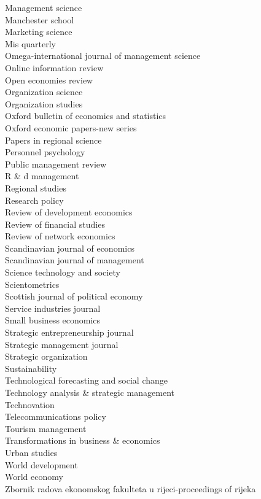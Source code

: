 \documentclass[a4paper]{article}
\begin{document}
\begin{footnotesize}
Management science \\ Manchester school \\ Marketing science \\ Mis quarterly \\ Omega-international journal of management science \\ Online information review \\ Open economies review \\ Organization science \\ Organization studies \\ Oxford bulletin of economics and statistics \\ Oxford economic papers-new series \\ Papers in regional science \\ Personnel psychology \\ Public management review \\ R \& d management \\ Regional studies \\ Research policy \\ Review of development economics \\ Review of financial studies \\ Review of network economics \\ Scandinavian journal of economics \\ Scandinavian journal of management \\ Science technology and society \\ Scientometrics \\ Scottish journal of political economy \\ Service industries journal \\ Small business economics \\ Strategic entrepreneurship journal \\ Strategic management journal \\ Strategic organization \\ Sustainability \\ Technological forecasting and social change \\ Technology analysis \& strategic management \\ Technovation \\ Telecommunications policy \\ Tourism management \\ Transformations in business \& economics \\ Urban studies \\ World development \\ World economy \\ Zbornik radova ekonomskog fakulteta u rijeci-proceedings of rijeka
\end{footnotesize}
\end{document}
